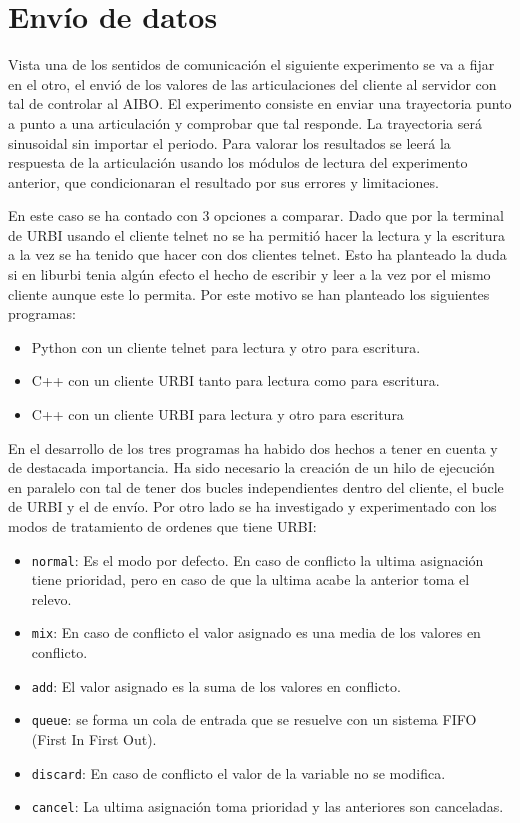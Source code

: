 \documentclass[12pt,a4paper,final,twoside]{book}
\begin{document}
\section{Envío de datos}\label{secenvdades}
Vista una de los sentidos de comunicación el siguiente experimento se va a fijar en el otro, el envió de los valores de las articulaciones del cliente al servidor con tal de controlar al AIBO.
El experimento consiste en enviar una trayectoria punto a punto a una articulación y comprobar que tal responde. La trayectoria será sinusoidal sin importar el periodo. Para valorar los resultados se leerá la respuesta de la articulación usando los módulos de lectura del experimento anterior, que condicionaran el resultado por sus errores y limitaciones. 

En este caso se ha contado con 3 opciones a comparar. Dado que por la terminal de URBI usando el cliente telnet no se ha permitió hacer la lectura y la escritura a la vez se ha tenido que hacer con dos clientes telnet. Esto ha planteado la duda si en liburbi tenia algún efecto el hecho de escribir y leer a la vez por el mismo cliente aunque este lo permita. Por este motivo se han planteado los siguientes programas:
\begin{itemize}
\item Python con un cliente telnet para lectura y otro para escritura.
\item C++ con un cliente URBI tanto para lectura como para escritura.
\item C++ con un cliente URBI para lectura y otro para escritura
\end{itemize}

En el desarrollo de los tres programas ha habido dos hechos a tener en cuenta y de destacada importancia.
Ha sido necesario la creación de un hilo de ejecución en paralelo con tal de tener dos bucles independientes dentro del cliente, el bucle de URBI y el de envío.
Por otro lado se ha investigado y experimentado con los modos de tratamiento  de ordenes que tiene URBI:
\begin{itemize}
\item \texttt{normal}: Es el modo por defecto. En caso de conflicto la ultima asignación tiene prioridad, pero en caso de que la ultima acabe la anterior toma el relevo.
\item \texttt{mix}: En caso de conflicto el valor asignado es una media de los valores en conflicto.
\item \texttt{add}: El valor asignado es la suma de los valores en conflicto.
\item \texttt{queue}: se forma un cola de entrada que se resuelve con un sistema FIFO (First In First Out).
\item \texttt{discard}: En caso de conflicto el valor de la variable no se modifica.
\item \texttt{cancel}: La ultima asignación toma prioridad y las anteriores son canceladas. 
\end{itemize}
\end{document}
